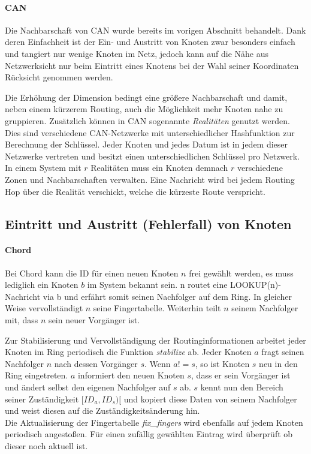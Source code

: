 \paragraph{CAN}
Die Nachbarschaft von CAN wurde bereits im vorigen Abschnitt behandelt. Dank deren Einfachheit ist der Ein- und Austritt von Knoten zwar besonders einfach und tangiert nur wenige Knoten im Netz, jedoch kann auf die Nähe aus Netzwerksicht nur beim Eintritt eines Knotens bei der Wahl seiner Koordinaten Rücksicht genommen werden.

Die Erhöhung der Dimension bedingt eine größere Nachbarschaft und damit, neben einem kürzerem Routing, auch die Möglichkeit mehr Knoten nahe zu gruppieren. Zusätzlich können in CAN sogenannte \emph{Realitäten} genutzt werden. Dies sind verschiedene CAN-Netzwerke mit unterschiedlicher Hashfunktion zur Berechnung der Schlüssel. Jeder Knoten und jedes Datum ist in jedem dieser Netzwerke vertreten und besitzt einen unterschiedlichen Schlüssel pro Netzwerk. In einem System mit $r$ Realitäten muss ein Knoten demnach $r$ verschiedene Zonen und Nachbarschaften verwalten. Eine Nachricht wird bei jedem Routing Hop über die Realität verschickt, welche die kürzeste Route verspricht.


\subsection*{Eintritt und Austritt (Fehlerfall) von Knoten}
\paragraph{Chord}
Bei Chord kann die ID für einen neuen Knoten $n$ frei gewählt werden, es muss lediglich ein Knoten $b$ im System bekannt sein. n routet eine LOOKUP(n)-Nachricht via b und erfährt somit seinen Nachfolger auf dem Ring. In gleicher Weise vervollständigt $n$ seine Fingertabelle. Weiterhin teilt $n$ seinem Nachfolger mit, dass $n$ sein neuer Vorgänger ist.

Zur Stabilisierung und Vervollständigung der Routinginformationen arbeitet jeder Knoten im Ring periodisch die Funktion \emph{stabilize} ab. Jeder Knoten $a$ fragt seinen Nachfolger $n$ nach dessen Vorgänger $s$. Wenn $a != s$, so ist Knoten $s$ neu in den Ring eingetreten. $a$ informiert den neuen Knoten $s$, dass er sein Vorgänger ist und ändert selbst den eigenen Nachfolger auf $s$ ab. $s$ kennt nun den Bereich seiner Zuständigkeit $[ID_a, ID_s)[$ und kopiert diese Daten von seinem Nachfolger und weist diesen auf die Zuständigkeitsänderung hin.\\
Die Aktualisierung der Fingertabelle \emph{fix\_fingers} wird ebenfalls auf jedem Knoten periodisch angestoßen. Für einen zufällig gewählten Eintrag wird überprüft ob dieser noch aktuell ist.

